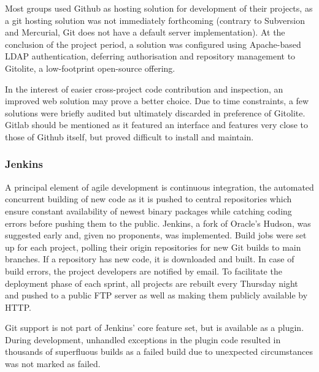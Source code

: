 Most groups used Github as hosting solution for development of their projects, as a git hosting solution was not immediately forthcoming (contrary to Subversion and Mercurial, Git does not have a default server implementation). At the conclusion of the project period, a solution was configured using Apache-based LDAP authentication, deferring authorisation and repository management to Gitolite, a low-footprint open-source offering.

In the interest of easier cross-project code contribution and inspection, an improved web solution may prove a better choice. Due to time constraints, a few solutions were briefly audited but ultimately discarded in preference of Gitolite. Gitlab should be mentioned as it featured an interface and features very close to those of Github itself, but proved difficult to install and maintain.


\subsubsection{Jenkins}
\label{subsub:jenkins}
A principal element of agile development is continuous integration, the automated concurrent building of new code as it is pushed to central repositories which ensure constant availability of newest binary packages while catching coding errors before pushing them to the public. Jenkins, a fork of Oracle's Hudson, was suggested early and, given no proponents, was implemented. Build jobs were set up for each project, polling their origin repositories for new Git builds to main branches. If a repository has new code, it is downloaded and built. In case of build errors, the project developers are notified by email. To facilitate the deployment phase of each sprint, all projects are rebuilt every Thursday night and pushed to a public FTP server as well as making them publicly available by HTTP.

Git support is not part of Jenkins' core feature set, but is available as a plugin. During development, unhandled exceptions in the plugin code resulted in thousands of superfluous builds as a failed build due to unexpected circumstances was not marked as failed.

